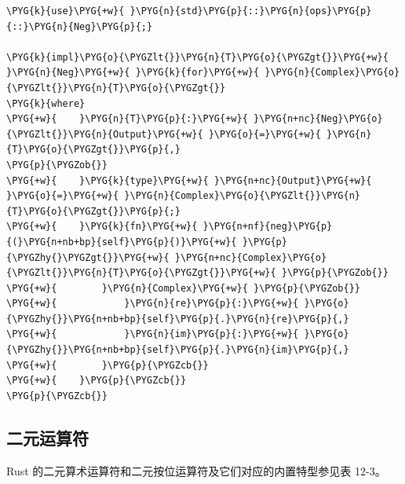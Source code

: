 \begin{Verbatim}[commandchars=\\\{\},breaklines=true,breakanywhere=true,fontsize=\codefont,xleftmargin=17bp]
\PYG{k}{use}\PYG{+w}{ }\PYG{n}{std}\PYG{p}{::}\PYG{n}{ops}\PYG{p}{::}\PYG{n}{Neg}\PYG{p}{;}

\PYG{k}{impl}\PYG{o}{\PYGZlt{}}\PYG{n}{T}\PYG{o}{\PYGZgt{}}\PYG{+w}{ }\PYG{n}{Neg}\PYG{+w}{ }\PYG{k}{for}\PYG{+w}{ }\PYG{n}{Complex}\PYG{o}{\PYGZlt{}}\PYG{n}{T}\PYG{o}{\PYGZgt{}}
\PYG{k}{where}
\PYG{+w}{    }\PYG{n}{T}\PYG{p}{:}\PYG{+w}{ }\PYG{n+nc}{Neg}\PYG{o}{\PYGZlt{}}\PYG{n}{Output}\PYG{+w}{ }\PYG{o}{=}\PYG{+w}{ }\PYG{n}{T}\PYG{o}{\PYGZgt{}}\PYG{p}{,}
\PYG{p}{\PYGZob{}}
\PYG{+w}{    }\PYG{k}{type}\PYG{+w}{ }\PYG{n+nc}{Output}\PYG{+w}{ }\PYG{o}{=}\PYG{+w}{ }\PYG{n}{Complex}\PYG{o}{\PYGZlt{}}\PYG{n}{T}\PYG{o}{\PYGZgt{}}\PYG{p}{;}
\PYG{+w}{    }\PYG{k}{fn}\PYG{+w}{ }\PYG{n+nf}{neg}\PYG{p}{(}\PYG{n+nb+bp}{self}\PYG{p}{)}\PYG{+w}{ }\PYG{p}{\PYGZhy{}\PYGZgt{}}\PYG{+w}{ }\PYG{n+nc}{Complex}\PYG{o}{\PYGZlt{}}\PYG{n}{T}\PYG{o}{\PYGZgt{}}\PYG{+w}{ }\PYG{p}{\PYGZob{}}
\PYG{+w}{        }\PYG{n}{Complex}\PYG{+w}{ }\PYG{p}{\PYGZob{}}
\PYG{+w}{            }\PYG{n}{re}\PYG{p}{:}\PYG{+w}{ }\PYG{o}{\PYGZhy{}}\PYG{n+nb+bp}{self}\PYG{p}{.}\PYG{n}{re}\PYG{p}{,}
\PYG{+w}{            }\PYG{n}{im}\PYG{p}{:}\PYG{+w}{ }\PYG{o}{\PYGZhy{}}\PYG{n+nb+bp}{self}\PYG{p}{.}\PYG{n}{im}\PYG{p}{,}
\PYG{+w}{        }\PYG{p}{\PYGZcb{}}
\PYG{+w}{    }\PYG{p}{\PYGZcb{}}
\PYG{p}{\PYGZcb{}}
\end{Verbatim}

\subsection{二元运算符}

Rust 的二元算术运算符和二元按位运算符及它们对应的内置特型参见表 12-3。



